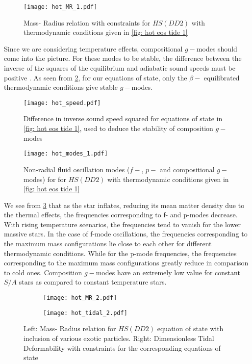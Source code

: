 \documentclass[a4paper,12pt,onehalfspacing]{report}
\begin{document}
\begin{figure}[ht]
    \centering
    \texttt{[image: hot\_MR\_1.pdf]}
    \caption{Mass- Radius relation with constraints for $HS(DD2)$ with thermodynamic conditions given in \cref{fig: hot eos tide 1}}
    \label{fig: hot MR}
\end{figure}

Since we are considering temperature effects, compositional $g-$modes should come into the picture. For these modes to be stable, the difference between the inverse of the squares of the equilibrium and adiabatic sound speeds must be positive \cite{lozanoTemperatureEffectsCore2022}. As seen from \cref{fig: hot sounds}, for our equations of state, only the $\beta-$ equilibrated thermodynamic conditions give stable $g-$modes. 

\begin{figure}[ht]
    \centering
    \texttt{[image: hot\_speed.pdf]}
    \caption{Difference in inverse sound speed squared for equations of state in \cref{fig: hot eos tide 1}, used to deduce the stability of composition $g-$ modes}
    \label{fig: hot sounds}
\end{figure}

\begin{figure}[ht]
    \centering
    \texttt{[image: hot\_modes\_1.pdf]}
    \caption{Non-radial fluid oscillation modes ($f-$, $p-$ and compositional $g-$ modes) for for $HS(DD2)$ with thermodynamic conditions given in \cref{fig: hot eos tide 1}}
    \label{fig: hot modes 1}
\end{figure}

We see from \cref{fig: hot modes 1} that as the star inflates, reducing its mean matter density due to the thermal effects, the frequencies corresponding to f- and p-modes decrease. With rising temperature scenarios, the frequencies tend to vanish for the lower massive stars. In the case of f-mode oscillations, the frequencies corresponding to the maximum mass configurations lie close to each other for different thermodynamic conditions. While for the p-mode frequencies, the frequencies corresponding to the maximum mass configurations greatly reduce in comparison to cold ones. Composition $g-$modes have an extremely low value for constant $S/A$ stars as compared to constant temperature stars. 

\begin{figure}[ht]
    \centering
    \begin{subfigure}{0.5\textwidth}
      \centering
      \texttt{[image: hot\_MR\_2.pdf]}
    \end{subfigure}%
    \begin{subfigure}{0.5\textwidth}
      \centering
      \texttt{[image: hot\_tidal\_2.pdf]}
    \end{subfigure}
    \caption{Left: Mass- Radius relation for $HS(DD2)$ equation of state with inclusion of various exotic particles. Right: Dimensionless Tidal Deformability with constraints for the corresponding equations of state}
    \label{fig: hot MR tide}
\end{figure}
\end{document}
